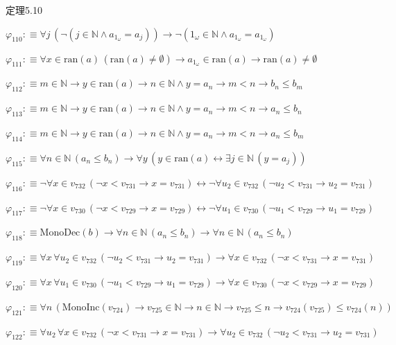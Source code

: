 \begin{fullproof}{定理5.10}
\begin{abbrevlist}
\item $\varphi_{110} :\equiv \forall j\,(\neg (j \in \mathbb{N} \land a_{1_{\omega}} = a_{j})) \to \neg (1_{\omega} \in \mathbb{N} \land a_{1_{\omega}} = a_{1_{\omega}})$
\item $\varphi_{111} :\equiv \forall x \in \mathrm{ran}(a)\,(\mathrm{ran}(a) \neq \emptyset) \to a_{1_{\omega}} \in \mathrm{ran}(a) \to \mathrm{ran}(a) \neq \emptyset$
\item $\varphi_{112} :\equiv m \in \mathbb{N} \to y \in \mathrm{ran}(a) \to n \in \mathbb{N} \land y = a_{n} \to m < n \to b_{n} \leq b_{m}$
\item $\varphi_{113} :\equiv m \in \mathbb{N} \to y \in \mathrm{ran}(a) \to n \in \mathbb{N} \land y = a_{n} \to m < n \to a_{n} \leq b_{n}$
\item $\varphi_{114} :\equiv m \in \mathbb{N} \to y \in \mathrm{ran}(a) \to n \in \mathbb{N} \land y = a_{n} \to m < n \to a_{n} \leq b_{m}$
\item $\varphi_{115} :\equiv \forall n \in \mathbb{N}\,(a_{n} \leq b_{n}) \to \forall y\,(y \in \mathrm{ran}(a) \leftrightarrow \exists j \in \mathbb{N}\,(y = a_{j}))$
\item $\varphi_{116} :\equiv \neg \forall x \in v_{732}\,(\neg x < v_{731} \to x = v_{731}) \leftrightarrow \neg \forall u_{2} \in v_{732}\,(\neg u_{2} < v_{731} \to u_{2} = v_{731})$
\item $\varphi_{117} :\equiv \neg \forall x \in v_{730}\,(\neg x < v_{729} \to x = v_{729}) \leftrightarrow \neg \forall u_{1} \in v_{730}\,(\neg u_{1} < v_{729} \to u_{1} = v_{729})$
\item $\varphi_{118} :\equiv \mathrm{MonoDec}(b) \to \forall n \in \mathbb{N}\,(a_{n} \leq b_{n}) \to \forall n \in \mathbb{N}\,(a_{n} \leq b_{n})$
\item $\varphi_{119} :\equiv \forall x\,\forall u_{2} \in v_{732}\,(\neg u_{2} < v_{731} \to u_{2} = v_{731}) \to \forall x \in v_{732}\,(\neg x < v_{731} \to x = v_{731})$
\item $\varphi_{120} :\equiv \forall x\,\forall u_{1} \in v_{730}\,(\neg u_{1} < v_{729} \to u_{1} = v_{729}) \to \forall x \in v_{730}\,(\neg x < v_{729} \to x = v_{729})$
\item $\varphi_{121} :\equiv \forall n\,(\mathrm{MonoInc}(v_{724}) \to v_{725} \in \mathbb{N} \to n \in \mathbb{N} \to v_{725} \leq n \to v_{724}(v_{725}) \leq v_{724}(n))$
\item $\varphi_{122} :\equiv \forall u_{2}\,\forall x \in v_{732}\,(\neg x < v_{731} \to x = v_{731}) \to \forall u_{2} \in v_{732}\,(\neg u_{2} < v_{731} \to u_{2} = v_{731})$

\end{abbrevlist}
\end{fullproof}
